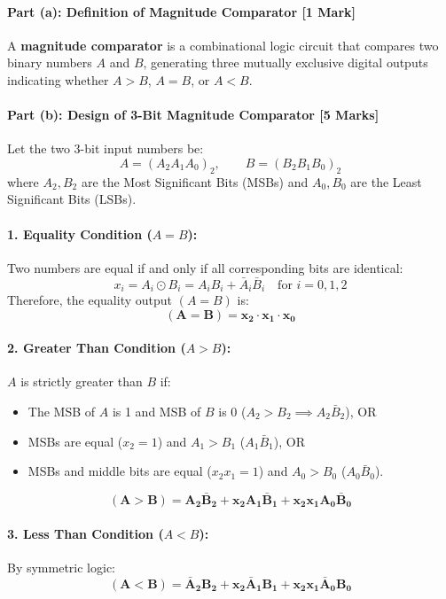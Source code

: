 \documentclass[11pt,a4paper,oneside]{book}
\begin{document}
\paragraph{Part (a): Definition of Magnitude Comparator [1 Mark]}
A \textbf{magnitude comparator} is a combinational logic circuit that compares two binary numbers $A$ and $B$, generating three mutually exclusive digital outputs indicating whether $A > B$, $A = B$, or $A < B$.

\paragraph{Part (b): Design of 3-Bit Magnitude Comparator [5 Marks]}
Let the two 3-bit input numbers be:
\[
A = (A_2 A_1 A_0)_2, \qquad B = (B_2 B_1 B_0)_2
\]
where $A_2, B_2$ are the Most Significant Bits (MSBs) and $A_0, B_0$ are the Least Significant Bits (LSBs).

\paragraph{1. Equality Condition ($A = B$):}
Two numbers are equal if and only if all corresponding bits are identical:
\[
x_i = A_i \odot B_i = A_i B_i + \bar{A}_i \bar{B}_i \quad \text{for } i = 0, 1, 2
\]
Therefore, the equality output $(A = B)$ is:
\[
\mathbf{(A = B) = x_2 \cdot x_1 \cdot x_0}
\]

\paragraph{2. Greater Than Condition ($A > B$):}
$A$ is strictly greater than $B$ if:
\begin{itemize}
  \item The MSB of $A$ is 1 and MSB of $B$ is 0 ($A_2 > B_2 \implies A_2 \bar{B}_2$), OR
  \item MSBs are equal ($x_2=1$) and $A_1 > B_1$ ($A_1 \bar{B}_1$), OR
  \item MSBs and middle bits are equal ($x_2 x_1 = 1$) and $A_0 > B_0$ ($A_0 \bar{B}_0$).
\end{itemize}
\[
\mathbf{(A > B) = A_2 \bar{B}_2 + x_2 A_1 \bar{B}_1 + x_2 x_1 A_0 \bar{B}_0}
\]

\paragraph{3. Less Than Condition ($A < B$):}
By symmetric logic:
\[
\mathbf{(A < B) = \bar{A}_2 B_2 + x_2 \bar{A}_1 B_1 + x_2 x_1 \bar{A}_0 B_0}
\]
\end{document}
